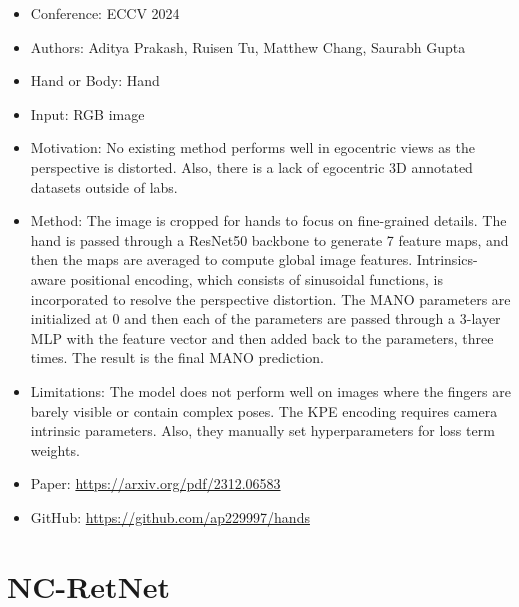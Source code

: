 \documentclass{article}
\begin{document}
\begin{itemize}
    \item Conference: ECCV 2024
    \item Authors: Aditya Prakash, Ruisen Tu, Matthew Chang, Saurabh Gupta
    \item Hand or Body: Hand
    \item Input: RGB image
    \item Motivation: No existing method performs well in egocentric views as the perspective is distorted. Also, there is a lack of egocentric 3D annotated datasets outside of labs.
    \item Method: The image is cropped for hands to focus on fine-grained details. The hand is passed through a ResNet50 backbone to generate 7 feature maps, and then the maps are averaged to compute global image features. Intrinsics-aware positional encoding, which consists of sinusoidal functions, is incorporated to resolve the perspective distortion. The MANO parameters are initialized at 0 and then each of the parameters are passed through a 3-layer MLP with the feature vector and then added back to the parameters, three times. The result is the final MANO prediction.
    \item Limitations: The model does not perform well on images where the fingers are barely visible or contain complex poses. The KPE encoding requires camera intrinsic parameters. Also, they manually set hyperparameters for loss term weights.
    \item Paper: \url{https://arxiv.org/pdf/2312.06583}
    \item GitHub: \url{https://github.com/ap229997/hands}
\end{itemize}

\section*{NC-RetNet}
\end{document}
